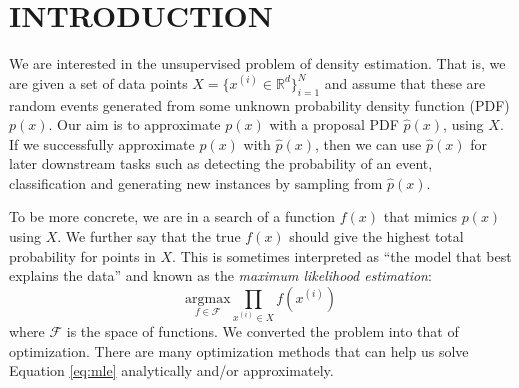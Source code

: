 \documentclass[a4paper,onesided,12pt]{report}
\begin{document}
\begin{abbreviations}
\end{abbreviations}

\chapter{INTRODUCTION}
\label{chapter:intro}

We are interested in the unsupervised problem of density estimation. That is, we are given a set of data points $X = \{x^{(i)} \in \mathbb{R}^d\}_{i=1}^N$ and assume that these are random events generated from some unknown probability density function (PDF) $p(x)$. Our aim is to approximate $p(x)$ with a proposal PDF $\hat{p}(x)$, using $X$. If we successfully approximate $p(x)$ with $\hat{p}(x)$, then we can use $\hat{p}(x)$ for later downstream tasks such as detecting the probability of an event, classification and generating new instances by sampling from $\hat{p}(x)$.

To be more concrete, we are in a search of a function $f(x)$ that mimics $p(x)$ using $X$. We further say that the true $f(x)$ should give the highest total probability for points in $X$. This is sometimes interpreted as ``the model that best explains the data'' and known as the \emph{maximum likelihood estimation}:
\begin{equation}
\underset{f \in \mathcal{F}}{\text{argmax}} \prod_{x^{(i)} \in X} f(x^{(i)})
\label{eq:mle}
\end{equation}
where $\mathcal{F}$ is the space of functions. We converted the problem into that of optimization. There are many optimization methods that can help us solve Equation \ref{eq:mle} analytically and/or approximately.
\end{document}
